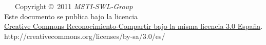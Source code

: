 \begin{flushright}
	\footnotesize{\ \ \ Copyright
	\copyright~2011 \textit{MSTI-SWL-Group} \\
	Este documento se publica bajo la licencia \\
\href{http://creativecommons.org/licenses/by-sa/3.0/es/}{Creative Commons
Reconocimiento-Compartir bajo la misma licencia 3.0 España}.
http://creativecommons.org/licenses/by-sa/3.0/es/}
\end{flushright}